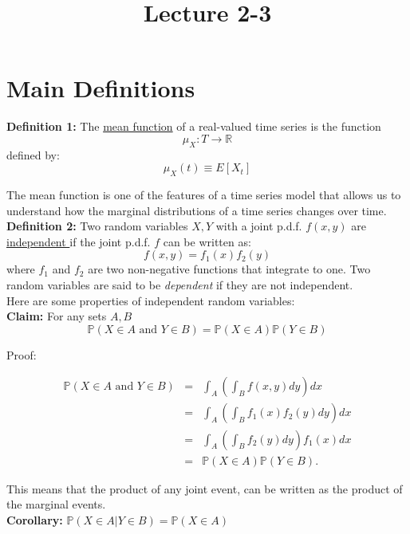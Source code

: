 \documentclass[12] {article}
\begin{document}
\onehalfspace

\title{Lecture 2-3}
\date{}
\maketitle

\section{Main Definitions}

\textbf{Definition 1:} The \underline{mean function} of a real-valued time series is the function
\[ \mu_{X}: T \rightarrow \mathbb{R} \]
defined by:
\[ \mu_{X}(t) \equiv E[X_t]\]

The mean function is one of the features of a time series model that allows us to understand how the marginal distributions of a time series changes over time.  \\


\noindent \textbf{Definition 2:} Two random variables $X,Y$ with a joint p.d.f. $f(x,y)$ are \underline{independent }if the joint p.d.f. $f$ can be written as:
\[ f(x,y) = f_1(x) f_2(y)  \]  
where $f_1$ and $f_2$ are two non-negative functions that integrate to one. Two random variables are said to be \emph{dependent} if they are not independent. \\

\noindent Here are some properties of independent random variables: \\

\noindent \textbf{Claim:} For any sets $A, B$ 
\[ \mathbb{P} (X \in A \textrm{ and } Y \in B) = \mathbb{P} (X \in A) \mathbb{P} (Y \in B)   \]

\noindent Proof:

\begin{eqnarray*}
\mathbb{P} (X \in A \textrm{ and } Y \in B) &=& \int_{A} \left( \int_{B}  f(x,y) dy \right) dx \\
&= & \int_{A} \left( \int_{B}  f_1(x) f_2(y) dy \right) dx \\
&=&  \int_{A} \left( \int_{B}   f_2(y) dy \right)  f_1 (x) dx \\
&=& \mathbb{P} (X \in A) \mathbb{P} (Y \in B).
\end{eqnarray*}

This means that the product of any joint event, can be written as the product of the marginal events.  \\

\textbf{Corollary:} $\mathbb{P}(X \in A | Y \in B) = \mathbb{P}(X \in A)$ \\
\end{document}
